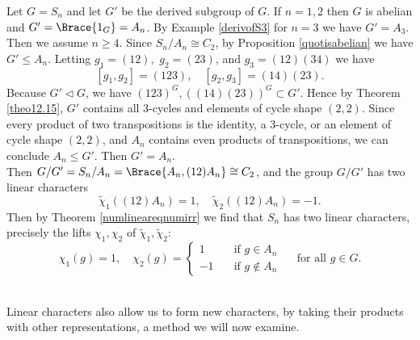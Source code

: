 \documentclass[../Project.tex]{subfiles}
\begin{document}
\begin{exam}
\label{lincharofSn}
	Let $G = S_n$ and let $G'$ be the derived subgroup of $G$. If $n = 1,2$ then $G$ is abelian and $G' = \Brace{1_{G}} = A_n$. By Example \ref{derivofS3} for $n = 3$ we have $G' = A_3$. Then we assume $n \geqslant 4$. Since $S_n/A_n \cong C_2$, by Proposition \ref{quotisabelian} we have $G' \leqslant A_n$. Letting $g_1 = (12),$ $g_2 = (23)$, and $g_3 = (12)(34)$ we have
	$$[g_1,g_2] = (123),\quad [g_2,g_3] = (14)(23).$$
	Because $G' \triangleleft G$, we have $(123)^G,((14)(23))^G \subset G'$. Hence by Theorem \ref{theo12.15}, $G'$ contains all $3$-cycles and elements of cycle shape $(2,2)$. Since every product of two transpositions is the identity, a $3$-cycle, or an element of cycle shape $(2,2)$, and $A_n$ contains even products of transpositions, we can conclude $A_n \leqslant G'$. Then $G' = A_n$.\\

	Then $G/G' =  S_n/A_n = \Brace{A_n,(12)A_n} \cong C_2$, and the group $G/G'$ has two linear characters
	$$\tilde\chi_1((12)A_n) = 1,\quad \tilde\chi_2((12)A_n) = -1.$$
	Then by Theorem \ref{numlineareqnumirr} we find that $S_n$ has two linear characters, precisely the lifts $\chi_1,\chi_2$ of $\tilde\chi_1,\tilde\chi_2$:
	$$\chi_1(g) = 1,\quad \chi_2(g) = \begin{cases}1\quad &\text{if }g \in A_n\\-1\quad &\text{if }g \notin A_n\end{cases}\quad \text{ for all } g \in G.$$\\
\end{exam}

Linear characters also allow us to form new characters, by taking their products with other representations, a method we will now examine.
\end{document}
